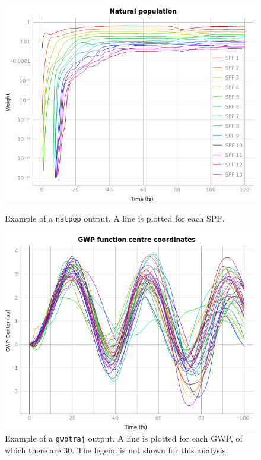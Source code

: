 \documentclass[12pt]{article}
\begin{document}
\begin{figure}[h]
    \centering
    \begin{minipage}[t]{.47\textwidth}
        \centering
        \includegraphics[width=\textwidth]{img/natpop.png}
        \caption{Example of a \texttt{natpop} output. A line is plotted for each SPF.}
        \label{fig:natpop}
    \end{minipage}\hfill\begin{minipage}[t]{.47\textwidth}
        \centering
        \includegraphics[width=\textwidth]{img/gwptraj.png}
        \caption{Example of a \texttt{gwptraj} output. A line is plotted for each GWP, of which there are 30. The legend is not shown for this analysis.}
        \label{fig:gwptraj}
    \end{minipage}
\end{figure}
\end{document}
